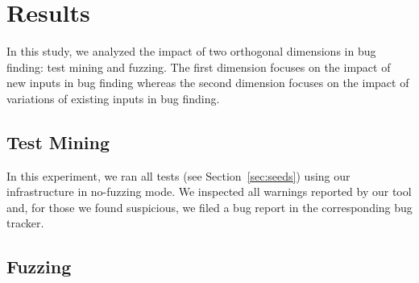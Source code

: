 \documentclass[10pt,conference,anonymous]{IEEEtran}
\begin{document}
\section{Results}
\label{sec:results}

In this study, we analyzed the impact of two orthogonal dimensions in
bug finding: test mining and fuzzing. The first dimension focuses on
the impact of new inputs in bug finding whereas the second dimension
focuses on the impact of variations of existing inputs in bug finding.

\subsection{Test Mining}

In this experiment, we ran all tests (see Section~\ref{sec:seeds})
using our infrastructure in no-fuzzing mode. We inspected all warnings
reported by our tool and, for those we found suspicious, we filed a
bug report in the corresponding bug tracker.





\subsection{Fuzzing}
\end{document}
